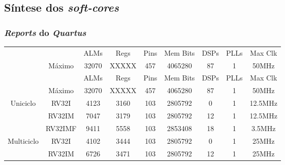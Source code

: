 \documentclass[aspectratio=169]{beamer}
\begin{document}
    \subsection{Síntese dos \textit{soft-cores}}
    \begin{frame}
        \frametitle{\textit{Reports} do \textit{Quartus}}
        \vfill
        \begin{footnotesize}
        \begin{longtable}{cc|c|c|c|c|c|c|c|}
            \cline{3-9}
                                                                    &                               & ALMs  & Regs  & Pins  & Mem Bits  & DSPs  & PLLs  & Max Clk   \\
            \cline{2-9}
                                                                    & \multicolumn{1}{|c|}{Máximo}  & 32070 & XXXXX & 457   & 4065280   & 87    & 1     & 50MHz     \\
            \hline
            \endfirsthead
            \cline{3-9}
                                                                    &                               & ALMs  & Regs  & Pins  & Mem Bits  & DSPs  & PLLs  & Max Clk   \\
            \cline{2-9}
                                                                    & \multicolumn{1}{|c|}{Máximo}  & 32070 & XXXXX & 457   & 4065280   & 87    & 1     & 50MHz     \\
            \hline
            \endhead
            \multicolumn{1}{|c}{\multirow{3}{*}{{Uniciclo}}}        & \multicolumn{1}{|c|}{RV32I}   & 4123  & 3160  & 103   & 2805792   & 0     & 1     & 12.5MHz   \\*
            \cline{2-9}
            \multicolumn{1}{|c}{ }                                  & \multicolumn{1}{|c|}{RV32IM}  & 7047  & 3179  & 103   & 2805792   & 12    & 1     & 12.5MHz   \\*
            \cline{2-9}
            \multicolumn{1}{|c}{ }                                  & \multicolumn{1}{|c|}{RV32IMF} & 9411  & 5558  & 103   & 2853408   & 18    & 1     & 3.5MHz    \\
            \hline
            \multicolumn{1}{|c}{\multirow{3}{*}{{Multiciclo}}}      & \multicolumn{1}{|c|}{RV32I}   & 4102  & 3444  & 103   & 2805792   & 0     & 1     & 25MHz     \\*
            \cline{2-9}
            \multicolumn{1}{|c}{ }                                  & \multicolumn{1}{|c|}{RV32IM}  & 6726  & 3471  & 103   & 2805792   & 12    & 1     & 25MHz     \\*

\end{longtable}
\end{footnotesize}
\end{frame}
\end{document}
